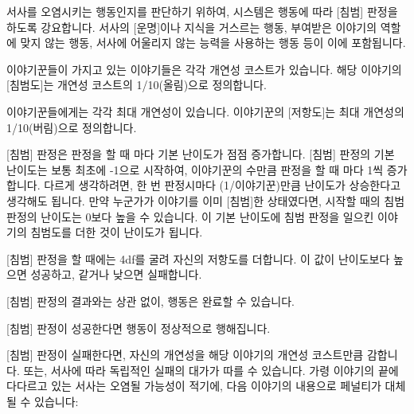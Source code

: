 \documentclass{report}
\begin{document}
	
	서사를 오염시키는 행동인지를 판단하기 위하여, 시스템은 행동에 따라 [침범] 판정을 하도록 강요합니다. 서사의 [운명]이나 지식을 거스르는 행동, 부여받은 이야기의 역할에 맞지 않는 행동, 서사에 어울리지 않는 능력을 사용하는 행동 등이 이에 포함됩니다.
	
	이야기꾼들이 가지고 있는 이야기들은 각각 개연성 코스트가 있습니다. 해당 이야기의 [침범도]는 개연성 코스트의 1/10(올림)으로 정의합니다.
	
	이야기꾼들에게는 각각 최대 개연성이 있습니다. 이야기꾼의 [저항도]는 최대 개연성의 1/10(버림)으로 정의합니다.
	
	\bigskip
	
	[침범] 판정은 판정을 할 때 마다 기본 난이도가 점점 증가합니다. [침범] 판정의 기본 난이도는 보통 최초에 -1으로 시작하여, 이야기꾼의 수만큼 판정을 할 때 마다 1씩 증가합니다. 다르게 생각하려면, 한 번 판정시마다 (1/이야기꾼)만큼 난이도가 상승한다고 생각해도 됩니다. 만약 누군가가 이야기를 이미 [침범]한 상태였다면, 시작할 때의 침범 판정의 난이도는 0보다 높을 수 있습니다. 이 기본 난이도에 침범 판정을 일으킨 이야기의 침범도를 더한 것이 난이도가 됩니다.
	
	[침범] 판정을 할 때에는 4df를 굴려 자신의 저항도를 더합니다. 이 값이 난이도보다 높으면 성공하고, 같거나 낮으면 실패합니다.
	
	[침범] 판정의 결과와는 상관 없이, 행동은 완료할 수 있습니다.
	
	[침범] 판정이 성공한다면 행동이 정상적으로 행해집니다.
	
	[침범] 판정이 실패한다면, 자신의 개연성을 해당 이야기의 개연성 코스트만큼 감합니다. 또는, 서사에 따라 독립적인 실패의 대가가 따를 수 있습니다. 가령 이야기의 끝에 다다르고 있는 서사는 오염될 가능성이 적기에, 다음 이야기의 내용으로 페널티가 대체될 수 있습니다:
	
\end{document}
